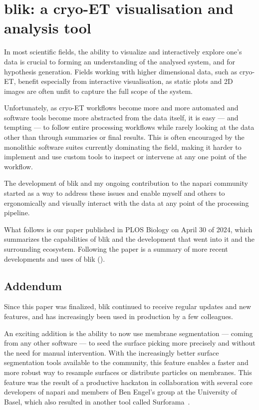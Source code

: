 \chapter{blik: a cryo-ET visualisation and analysis tool}\label{blik}

In most scientific fields, the ability to visualize and interactively explore one's data is crucial to forming an understanding of the analysed system, and for hypothesis generation.
Fields working with higher dimensional data, such as cryo-ET, benefit especially from interactive visualisation, as static plots and 2D images are often unfit to capture the full scope of the system.

Unfortunately, as cryo-ET workflows become more and more automated and software tools become more abstracted from the data itself, it is easy --- and tempting --- to follow entire processing workflows while rarely looking at the data other than through summaries or final results.
This is often encouraged by the monolithic software suites currently dominating the field, making it harder to implement and use custom tools to inspect or intervene at any one point of the workflow.

The development of blik and my ongoing contribution to the napari community~\cite{thenaparicommunityNapariMultidimensionalImage2024} started as a way to address these issues and enable myself and others to ergonomically and visually interact with the data at any point of the processing pipeline.

What follows is our paper published in PLOS Biology on April 30 of 2024, which summarizes the capabilities of blik and the development that went into it and the surrounding ecosystem.
Following the paper is a summary of more recent developments and uses of blik ().

\localtableofcontents
\newpage

\newpage

\section{Addendum}\label{blik_addendum}

Since this paper was finalized, blik continued to receive regular updates and new features, and has increasingly been used in production by a few colleagues.

An exciting addition is the ability to now use membrane segmentation --- coming from any other software --- to seed the surface picking more precisely and without the need for manual intervention.
With the increasingly better surface segmentation tools available to the community, this feature enables a faster and more robust way to resample surfaces or distribute particles on membranes.
This feature was the result of a productive hackaton in collaboration with several core developers of napari and members of Ben Engel's group at the University of Basel, which also resulted in another tool called Surforama~\cite{yamauchiSurforamaInteractiveExploration2024}.

